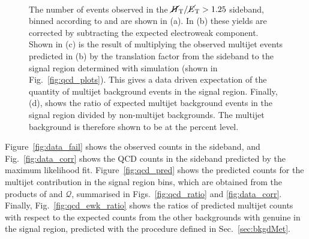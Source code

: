 \begin{figure}[!h]
{  } \\
  \caption{The number of events observed in the $\mbox{$\mbox{$\cancel{H}_\text{T}$} / \mbox{$\cancel{E}_\text{T}$}$}>1.25$ sideband, 
    binned according to \njet and \scalht are shown in (a). In
    (b) these yields are corrected by subtracting the expected
    electroweak component. Shown in
    (c) is the result of multiplying the observed multijet events predicted
    in (b) by the translation factor from the sideband to the signal
    region determined with simulation (shown in
    Fig.~\ref{fig:qcd_plots}). This gives a data driven expectation of
    the quantity of multijet background events in the signal region. 
    Finally, (d), shows the ratio of expected
    multijet background events in the signal region divided by
    non-multijet backgrounds. The multijet background is therefore
    shown to be at the percent level.}
  \label{fig:qcd_plots2}
\end{figure}


Figure~\ref{fig:data_fail} shows the observed counts in the \mhtmet
sideband, and Fig.~\ref{fig:data_corr} shows the QCD counts 
in the sideband predicted by the maximum likelihood fit.
Figure~\ref{fig:qcd_pred} shows the predicted counts for the multijet
contribution in the signal region bins, which are obtained from the
products of \rmhtmet and $\mathcal{Q}$, summarised in
Figs.~\ref{fig:qcd_ratio} and \ref{fig:data_corr}. Finally,
Fig.~\ref{fig:qcd_ewk_ratio} shows the ratios of predicted multijet
counts with respect to the expected counts from the other backgrounds
with genuine \MET in the signal region, predicted with the procedure
defined in Sec.~\ref{sec:bkgdMet}.

